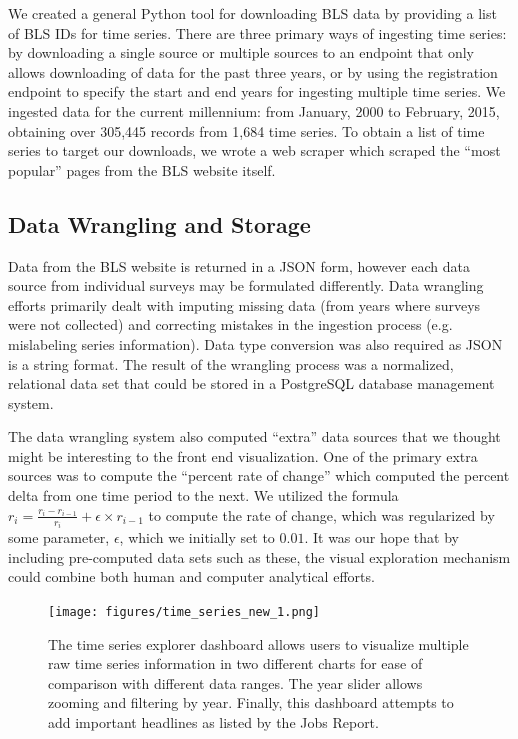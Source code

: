 \documentclass{sigchi}
\begin{document}
We created a general Python tool for downloading BLS data by providing a list of BLS IDs for time series. There are three primary ways of ingesting time series: by downloading a single source or multiple sources to an endpoint that only allows downloading of data for the past three years, or by using the registration endpoint to specify the start and end years for ingesting multiple time series. We ingested data for the current millennium: from January, 2000 to February, 2015, obtaining over 305,445 records from 1,684 time series. To obtain a list of time series to target our downloads, we wrote a web scraper which scraped the ``most popular'' pages from the BLS website itself.

\subsection{Data Wrangling and Storage}

Data from the BLS website is returned in a JSON form, however each data source from individual surveys may be formulated differently. Data wrangling efforts primarily dealt with imputing missing data (from years where surveys were not collected) and correcting mistakes in the ingestion process (e.g. mislabeling series information). Data type conversion was also required as JSON is a string format. The result of the wrangling process was a normalized, relational data set that could be stored in a PostgreSQL database management system.

The data wrangling system also computed ``extra'' data sources that we thought might be interesting to the front end visualization. One of the primary extra sources was to compute the ``percent rate of change'' which computed the percent delta from one time period to the next. We utilized the formula $r_i = \frac{r_i - r_{i-1}}{r_i} + \epsilon \times r_{i-1}$ to compute the rate of change, which was regularized by some parameter, $\epsilon$, which we initially set to $0.01$.  It was our hope that by including pre-computed data sets such as these, the visual exploration mechanism could combine both human and computer analytical efforts.

\begin{figure}[!ht]
    \centering
    \texttt{[image: figures/time\_series\_new\_1.png]}
    \caption{The time series explorer dashboard allows users to visualize multiple raw time series information in two different charts for ease of comparison with different data ranges. The year slider allows zooming and filtering by year. Finally, this dashboard attempts to add important headlines as listed by the Jobs Report.}
    \label{fig:time_series}
\end{figure}
\end{document}
